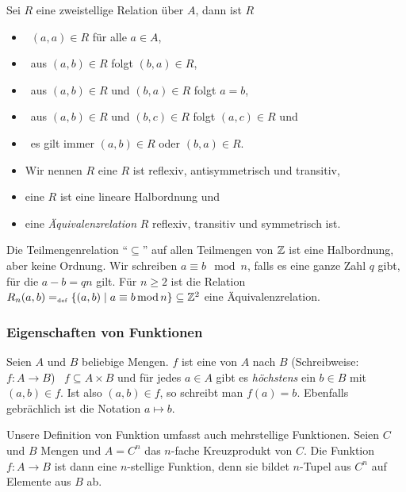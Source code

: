 \begin{definition}
Sei $R$ eine zweistellige Relation über $A$, dann ist $R$
\begin{itemize}
%
\item {} \gdw \ $(a,a) \in R$ für alle $a \in A$,
%
\item {} \gdw \ aus $(a,b) \in R$ folgt $(b,a) \in R$,
%
\item {} \gdw \ aus $(a,b) \in R$ und $(b,a) \in R$ folgt $a =
b$,
%
\item {} \gdw \ aus $(a,b) \in R$ und $(b,c) \in R$ folgt $(a,c)
\in R$ und 
%
\item {} \gdw \ es gilt immer $(a,b) \in R$ oder $(b, a) \in R$.
%
\item Wir nennen $R$ eine  \gdw $R$ ist reflexiv,
antisymmetrisch und transitiv,
%
\item eine  \gdw $R$ ist eine lineare Halbordnung und
%
\item eine \emph{Äquivalenzrelation} 
\gdw $R$ reflexiv, transitiv und symmetrisch ist.
%
\end{itemize}
\end{definition}

\begin{example}
Die Teilmengenrelation "`$\subseteq$"' auf allen Teilmengen von $\mathbb Z$ ist
eine Halbordnung, aber keine Ordnung. Wir schreiben $a \equiv b \mod
n$, falls es eine ganze Zahl $q$ gibt, für die $a - b = q n$ gilt. Für $n \ge 2$
ist die Relation $R_n(a,b) =_{\mathrm{\scriptscriptstyle def}} \{(a,b) \mid a \equiv b \mathrm{\,mod\,} n\} \subseteq
\mathbb Z^2$ eine Äquivalenzrelation.
\end{example}

\subsubsection{Eigenschaften von Funktionen}
\label{PropFunc}
Seien $A$ und $B$ beliebige Mengen. $f$ ist eine  von $A$ nach
$B$ (Schreibweise: $f \colon A \rightarrow B$) \gdw \ $f \subseteq A \times
B$ und für jedes $a \in A$ gibt es \emph{höchstens} ein $b \in B$ mit
$(a, b) \in f$. Ist also $(a,b) \in f$, so schreibt man $f(a) =
b$. Ebenfalls gebrächlich ist die Notation $a \mapsto b$.

\begin{remark}
Unsere Definition von Funktion umfasst auch mehrstellige
Funktionen. Seien $C$ und $B$ Mengen und $A = C^n$ das $n$-fache
Kreuzprodukt von $C$. Die Funktion $f \colon A \rightarrow B$ ist dann
eine $n$-stellige Funktion, denn sie bildet $n$-Tupel aus $C^n$ auf Elemente
aus $B$ ab.
\end{remark}

